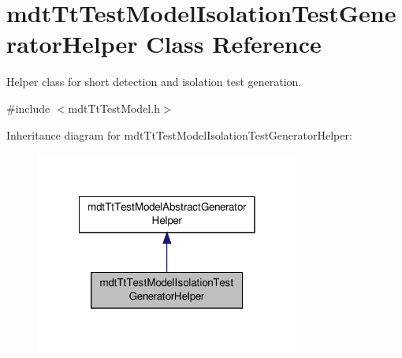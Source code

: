 \hypertarget{classmdt_tt_test_model_isolation_test_generator_helper}{\section{mdt\-Tt\-Test\-Model\-Isolation\-Test\-Generator\-Helper Class Reference}
\label{classmdt_tt_test_model_isolation_test_generator_helper}
}


Helper class for short detection and isolation test generation.  




{\ttfamily \#include $<$mdt\-Tt\-Test\-Model.\-h$>$}



Inheritance diagram for mdt\-Tt\-Test\-Model\-Isolation\-Test\-Generator\-Helper\-:
\nopagebreak
\begin{figure}[H]
\begin{center}
\leavevmode
\includegraphics[width=246pt]{classmdt_tt_test_model_isolation_test_generator_helper__inherit__graph}
\end{center}
\end{figure}


